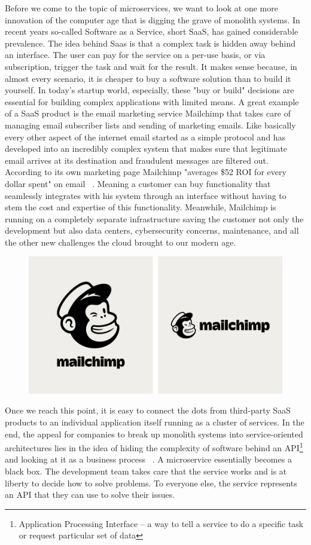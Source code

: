 Before we come to the topic of microservices, we want to look at one more innovation of the computer age that is digging the grave of monolith systems. In recent years so-called Software as a Service, short SaaS, has gained considerable prevalence. The idea behind Saas is that a complex task is hidden away behind an interface. The user can pay for the service on a per-use basis, or via subscription, trigger the task and wait for the result. It makes sense because, in almost every scenario, it is cheaper to buy a software solution than to build it yourself. In today's startup world, especially, these "buy or build" decisions are essential for building complex applications with limited means. A great example of a SaaS product is the email marketing service Mailchimp that takes care of managing email subscriber lists and sending of marketing emails. Like basically every other aspect of the internet email started as a simple protocol and has developed into an incredibly complex system that makes sure that legitimate email arrives at its destination and fraudulent messages are filtered out. According to its own marketing page Mailchimp "averages \$52 ROI for every dollar spent" on email ~\cite{mailchimp.2020}. Meaning a customer can buy functionality that seamlessly integrates with his system through an interface without having to stem the cost and expertise of this functionality. Meanwhile, Mailchimp is running on a completely separate infrastructure saving the customer not only the development but also data centers, cybersecurity concerns, maintenance, and all the other new challenges the cloud brought to our modern age.

\begin{figure}[ht]
  \centering
  \includegraphics[width=0.8\linewidth]{assets/mailchimp-brand.png}
\end{figure}

Once we reach this point, it is easy to connect the dots from third-party SaaS products to an individual application itself running as a cluster of services. In the end, the appeal for companies to break up monolith systems into service-oriented architectures lies in the idea of hiding the complexity of software behind an API\footnote{Application Processing Interface – a way to tell a service to do a specific task or request particular set of data} and looking at it as a business process ~\cite[p.~359]{melzer.2010}. A microservice essentially becomes a black box. The development team takes care that the service works and is at liberty to decide how to solve problems. To everyone else, the service represents an API that they can use to solve their issues.



